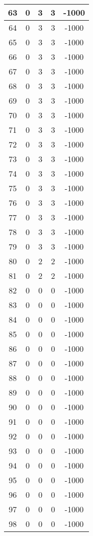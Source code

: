 \documentclass[letterpaper, 12pt]{article}
\begin{document}
\begin{longtable}{|c|c|c|c|c|}
\hline
63 & 0 & 3 & 3 & -1000 \\
\hline
64 & 0 & 3 & 3 & -1000 \\
\hline
65 & 0 & 3 & 3 & -1000 \\
\hline
66 & 0 & 3 & 3 & -1000 \\
\hline
67 & 0 & 3 & 3 & -1000 \\
\hline
68 & 0 & 3 & 3 & -1000 \\
\hline
69 & 0 & 3 & 3 & -1000 \\
\hline
70 & 0 & 3 & 3 & -1000 \\
\hline
71 & 0 & 3 & 3 & -1000 \\
\hline
72 & 0 & 3 & 3 & -1000 \\
\hline
73 & 0 & 3 & 3 & -1000 \\
\hline
74 & 0 & 3 & 3 & -1000 \\
\hline
75 & 0 & 3 & 3 & -1000 \\
\hline
76 & 0 & 3 & 3 & -1000 \\
\hline
77 & 0 & 3 & 3 & -1000 \\
\hline
78 & 0 & 3 & 3 & -1000 \\
\hline
79 & 0 & 3 & 3 & -1000 \\
\hline
80 & 0 & 2 & 2 & -1000 \\
\hline
81 & 0 & 2 & 2 & -1000 \\
\hline
82 & 0 & 0 & 0 & -1000 \\
\hline
83 & 0 & 0 & 0 & -1000 \\
\hline
84 & 0 & 0 & 0 & -1000 \\
\hline
85 & 0 & 0 & 0 & -1000 \\
\hline
86 & 0 & 0 & 0 & -1000 \\
\hline
87 & 0 & 0 & 0 & -1000 \\
\hline
88 & 0 & 0 & 0 & -1000 \\
\hline
89 & 0 & 0 & 0 & -1000 \\
\hline
90 & 0 & 0 & 0 & -1000 \\
\hline
91 & 0 & 0 & 0 & -1000 \\
\hline
92 & 0 & 0 & 0 & -1000 \\
\hline
93 & 0 & 0 & 0 & -1000 \\
\hline
94 & 0 & 0 & 0 & -1000 \\
\hline
95 & 0 & 0 & 0 & -1000 \\
\hline
96 & 0 & 0 & 0 & -1000 \\
\hline
97 & 0 & 0 & 0 & -1000 \\
\hline
98 & 0 & 0 & 0 & -1000 \\

\end{longtable}
\end{document}
